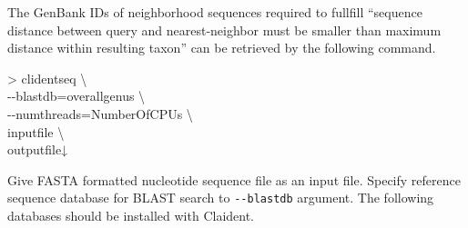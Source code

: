 \documentclass[titlepage,10pt,a4paper,english]{jsbook}
\newenvironment{cmd}{\begin{oframed}\raggedright\ttfamily\footnotesize\setlength{\baselineskip}{1.4em}}{\end{oframed}\vspace{-1em}}
\begin{document}
The GenBank IDs of neighborhood sequences required to fullfill ``sequence distance between query and nearest-neighbor must be smaller than maximum distance within resulting taxon'' can be retrieved by the following command.
\begin{cmd}
{\textgreater} clidentseq {\textbackslash}\\
{-}{-}blastdb=overall{\textunderscore}genus {\textbackslash}\\
{-}{-}numthreads=NumberOfCPUs {\textbackslash}\\
inputfile {\textbackslash}\\
outputfile↓
\end{cmd}
Give FASTA formatted nucleotide sequence file as an input file.
Specify reference sequence database for BLAST search to \texttt{{-}{-}blastdb} argument.
The following databases should be installed with Claident.
\end{document}
